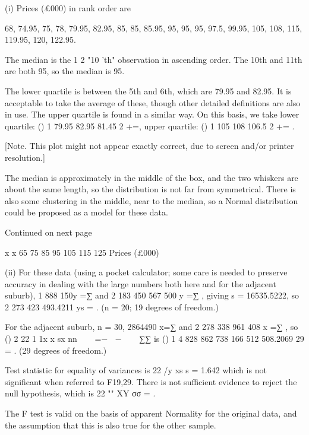 \documentclass[a4paper,12pt]{article}
\begin{document}
(i) Prices (£000) in rank order are 
 
68, 74.95, 75, 78, 79.95, 82.95, 85, 85, 85.95, 95, 95, 95, 97.5, 99.95, 105, 108, 115, 119.95, 120, 122.95. 
 
The median is the 1 2 "10 'th" observation in ascending order.  The 10th and 11th are both 95, so the median is 95. 
 
The lower quartile is between the 5th and 6th, which are 79.95 and 82.95.  It is acceptable to take the average of these, though other detailed definitions are also in use.  The upper quartile is found in a similar way.  On this basis, we take lower quartile:   () 1 79.95 82.95 81.45 2 +=,      upper quartile:   () 1 105 108 106.5 2 += . 
 
 
 
 
 
 
 
 
 
 
[Note.  This plot might not appear exactly correct, due to screen and/or printer resolution.] 
 
 
 
The median is approximately in the middle of the box, and the two whiskers are about the same length, so the distribution is not far from symmetrical.  There is also some clustering in the middle, near to the median, so a Normal distribution could be proposed as a model for these data. 
 
 
 
 
 
 
 
 
 
 
 
 
Continued on next page 
 
x x
 65  75  85  95  105 115 125 Prices (£000) 

 
 
(ii) For these data (using a pocket calculator;  some care is needed to preserve accuracy in dealing with the large numbers both here and for the adjacent suburb), 1 888 150y =∑ and 2 183 450 567 500 y =∑ , giving s = 16535.5222, so 2 273 423 493.4211 ys = .  (n = 20;  19 degrees of freedom.) 
 
 
For the adjacent suburb, n = 30, 2864490 x=∑ and 2 278 338 961 408 x =∑ , so () 2 22 1 1x x sx nn   =− −   ∑∑ is () 1 4 828 862 738 166 512 508.2069 29 = .  (29 degrees of freedom.) 
 
 
Test statistic for equality of variances is 22 /y xs s = 1.642 which is not significant when referred to F19,29.  There is not sufficient evidence to reject the null hypothesis, which is 22 "" XY σσ = . 
 
 
The F test is valid on the basis of apparent Normality for the original data, and the assumption that this is also true for the other sample. 
\end{document}
